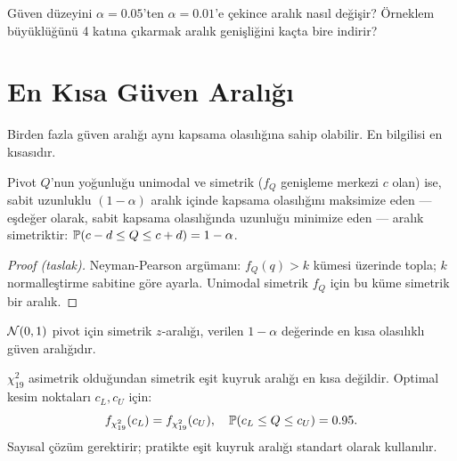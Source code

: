 \begin{kendinleifade}
Güven düzeyini $\alpha=0.05$'ten $\alpha=0.01$'e çekince aralık nasıl değişir? Örneklem büyüklüğünü 4 katına çıkarmak aralık genişliğini kaçta bire indirir?
\end{kendinleifade}

\section{En Kısa Güven Aralığı}
\label{sec:en_kisa_ga}

Birden fazla güven aralığı aynı kapsama olasılığına sahip olabilir. En bilgilisi en kısasıdır.

\begin{teorem}\label{thm:en_kisa}
Pivot $Q$'nun yoğunluğu unimodal ve simetrik ($f_Q$ genişleme merkezi $c$ olan) ise, sabit uzunluklu $(1-\alpha)$ aralık içinde kapsama olasılığını maksimize eden --- eşdeğer olarak, sabit kapsama olasılığında uzunluğu minimize eden --- aralık simetriktir: $\mathbb{P}(c-d\leq Q\leq c+d)=1-\alpha$.
\end{teorem}

\begin{proof}[Proof (taslak)]
Neyman-Pearson argümanı: $f_Q(q)>k$ kümesi üzerinde topla; $k$ normalleştirme sabitine göre ayarla. Unimodal simetrik $f_Q$ için bu küme simetrik bir aralık.
\end{proof}

\begin{sonuc}\label{cor:normal_optimal}
$\mathcal{N}(0,1)$ pivot için simetrik $z$-aralığı, verilen $1-\alpha$ değerinde en kısa olasılıklı güven aralığıdır.
\end{sonuc}

\begin{ornek}\label{ex:chi2_en_kisa}
$\chi^2_{19}$ asimetrik olduğundan simetrik eşit kuyruk aralığı en kısa değildir. Optimal kesim noktaları $c_L, c_U$ için:
\[
  f_{\chi^2_{19}}(c_L) = f_{\chi^2_{19}}(c_U), \quad \mathbb{P}(c_L\leq Q\leq c_U)=0.95.
\]
Sayısal çözüm gerektirir; pratikte eşit kuyruk aralığı standart olarak kullanılır.
\end{ornek}

